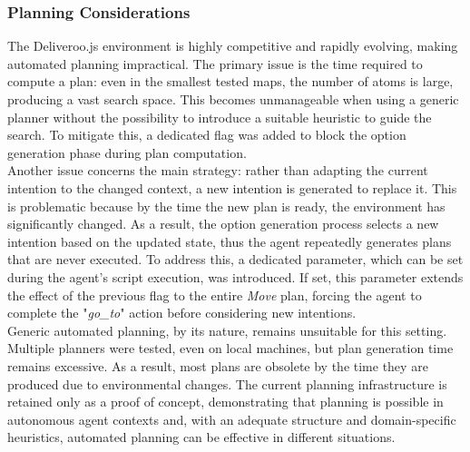         \subsubsection{Planning Considerations}
            The Deliveroo.js environment is highly competitive and rapidly evolving, making automated planning impractical. The primary issue is the time required to compute a plan: even in the smallest tested maps, the number of atoms is large, producing a vast search space. This becomes unmanageable when using a generic planner without the possibility to introduce a suitable heuristic to guide the search. To mitigate this, a dedicated flag was added to block the option generation phase during plan computation.
            \medskip\\
            Another issue concerns the main strategy: rather than adapting the current intention to the changed context, a new intention is generated to replace it. This is problematic because by the time the new plan is ready, the environment has significantly changed. As a result, the option generation process selects a new intention based on the updated state, thus the agent repeatedly generates plans that are never executed. To address this, a dedicated parameter, which can be set during the agent's script execution, was introduced. If set, this parameter extends the effect of the previous flag to the entire \textit{Move} plan, forcing the agent to complete the "\textit{go\_to}" action before considering new intentions.
            \medskip\\
            Generic automated planning, by its nature, remains unsuitable for this setting. Multiple planners were tested, even on local machines, but plan generation time remains excessive. As a result, most plans are obsolete by the time they are produced due to environmental changes. The current planning infrastructure is retained only as a proof of concept, demonstrating that planning is possible in autonomous agent contexts and, with an adequate structure and domain-specific heuristics, automated planning can be effective in different situations.

